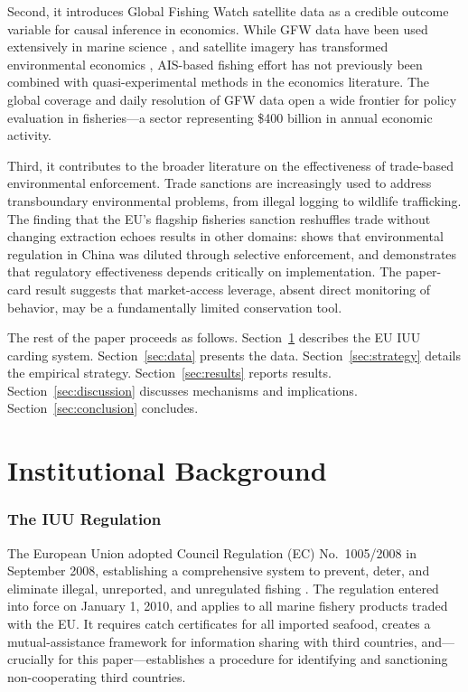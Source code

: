 \documentclass[12pt]{article}
\begin{document}
Second, it introduces Global Fishing Watch satellite data as a credible outcome variable for causal inference in economics. While GFW data have been used extensively in marine science \citep{kroodsma2018tracking, tickler2018far, boerder2018global}, and satellite imagery has transformed environmental economics \citep{burgess2018production, jayachandran2017cash}, AIS-based fishing effort has not previously been combined with quasi-experimental methods in the economics literature. The global coverage and daily resolution of GFW data open a wide frontier for policy evaluation in fisheries---a sector representing \$400 billion in annual economic activity.

Third, it contributes to the broader literature on the effectiveness of trade-based environmental enforcement. Trade sanctions are increasingly used to address transboundary environmental problems, from illegal logging to wildlife trafficking. The finding that the EU's flagship fisheries sanction reshuffles trade without changing extraction echoes results in other domains: \citet{he2020watering} shows that environmental regulation in China was diluted through selective enforcement, and \citet{greenstone2004did} demonstrates that regulatory effectiveness depends critically on implementation. The paper-card result suggests that market-access leverage, absent direct monitoring of behavior, may be a fundamentally limited conservation tool.

The rest of the paper proceeds as follows. Section~\ref{sec:background} describes the EU IUU carding system. Section~\ref{sec:data} presents the data. Section~\ref{sec:strategy} details the empirical strategy. Section~\ref{sec:results} reports results. Section~\ref{sec:discussion} discusses mechanisms and implications. Section~\ref{sec:conclusion} concludes.


\section{Institutional Background}
\label{sec:background}

\subsubsection*{The IUU Regulation} The European Union adopted Council Regulation (EC) No.\ 1005/2008 in September 2008, establishing a comprehensive system to prevent, deter, and eliminate illegal, unreported, and unregulated fishing \citep{european2008iuu}. The regulation entered into force on January 1, 2010, and applies to all marine fishery products traded with the EU. It requires catch certificates for all imported seafood, creates a mutual-assistance framework for information sharing with third countries, and---crucially for this paper---establishes a procedure for identifying and sanctioning non-cooperating third countries.
\end{document}
